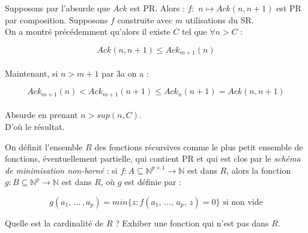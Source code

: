 \documentclass[12pt,letterpaper,boxed]{hmcpset}
\begin{document}
\begin{solution}
  \begin{solution}[(e)]
  Supposons par l'absurde que $Ack$ est PR. Alors : $f: \, \, n \mapsto Ack(n,n+1)$ est PR par composition. Supposons $f$ construite avec $m$ utilisations du SR.\\
   On a montré précédemment qu'alors il existe $C$ tel que $\forall n > C$ :
   
   $$ Ack(n,n+1) \leq Ack_{m+1}(n) $$
   \ \\
   
  \noindent Maintenant, si $n > m+1$ par 3a on a :
   
   $$ Ack_{m+1}(n) < Ack_{m+1}(n+1) \leq Ack_{n}(n+1) = Ack(n,n+1) $$ 
   \ \\
   \noindent Absurde en prenant $n > sup(n,C)$.
   \\
   D'où le résultat.
   \end{solution}

\end{solution}

 \newpage
\begin{problem}[Question 4]

On définit l'ensemble $R$ des fonctions récursives comme le plus petit ensemble de fonctions, éventuellement partielle, qui contient PR et qui est clos par le \textit{schéma de minimisation non-borné} : si $f : A \subseteq \mathbb{N}^{p+1} \to \mathbb{N}$ est dans $R$, alors la fonction $g : B \subseteq \mathbb{N}^{p} \to \mathbb{N}$ est dans $R$, où $g$ est définie par :

$$ g(a_{1}, \, \dots \,, a_{p}) = min \{ z : f(a_{1}, \, \dots , \, a_{p} , \, z) = 0 \} \text{ si non vide}$$
 
Quelle est la cardinalité de $R$ ? Exhiber une fonction qui n'est pas dans $R$.

\end{problem}
\end{document}
